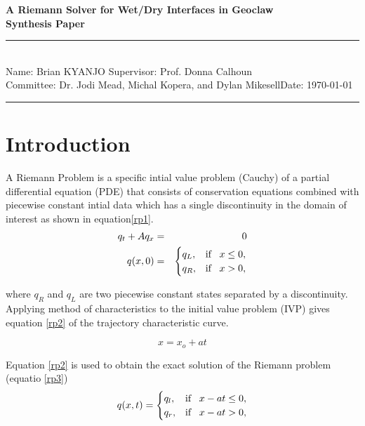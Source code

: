 \documentclass[12pt,a4paper]{article}
\newcommand{\student}{Brian KYANJO }
\newcommand{\course}{Dr. Jodi Mead, Michal Kopera, and Dylan Mikesell}
\newcommand{\assignment}{ Prof. Donna Calhoun}
\begin{document}
	
	\thispagestyle{empty}
	\begin{center}
		\textbf{A Riemann Solver for Wet/Dry Interfaces in Geoclaw \\[0.5cm]
			Synthesis Paper}
		\vspace{.2cm}
	\end{center}
	
	\noindent
	\rule{17cm}{0.2cm}\\[0.3cm]
	Name: \student \hfill Supervisor: \assignment\\[0.1cm]
	Committee: \course \hfill Date: \today\\
	\rule{17cm}{0.05cm}
	\vspace{.2cm}
	
	\section{Introduction}
	A Riemann Problem is a specific intial value problem  (Cauchy) of a partial differential equation (PDE) that consists of conservation equations combined with piecewise constant intial data which has a single discontinuity in the domain of interest as shown in equation\eqref{rp1}. 
	\begin{eqnarray}
		q_{t} + A q_{x}& =& 0
		\label{rp0}\\
		q(x,0)& =& \begin{cases}
			q_{L}, & \text{if \, $x \le 0,$}\\
			q_{R},& \text{if \, $x > 0,$}\\
			
		\end{cases}  
		\label{rp1}     
	\end{eqnarray}
	
	
	\noindent where $q_{R}$ and $q_{L}$ are two piecewise constant states separated by a discontinuity. Applying method of characteristics to the initial value problem (IVP) gives  equation \eqref{rp2} of the trajectory characteristic curve.
	
	\begin{equation}
		x = x_{o} + at 
		\label{rp2}
	\end{equation}
	
	
	\noindent Equation \eqref{rp2} is used to obtain the exact solution of the Riemann problem (equatio \eqref{rp3})
	\begin{equation}
		q(x,t)  = \begin{cases}
			q_{l}, & \text{if \, $x - at \le 0,$}\\
			q_{r},& \text{if \, $x - at > 0,$}\\
			
		\end{cases}    
		\label{rp3}   
	\end{equation}
	
\end{document}

